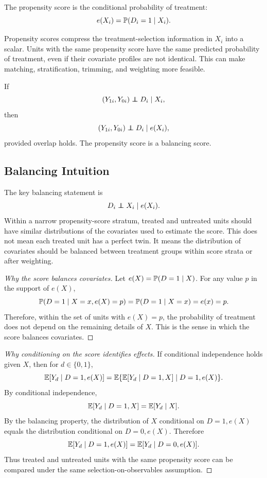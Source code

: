 \begin{defN}
The propensity score is the conditional probability of treatment:
\[
    e(X_i)=\mathbb{P}(D_i=1\mid X_i).
\]
\end{defN}

Propensity scores compress the treatment-selection information in \(X_i\) into
a scalar. Units with the same propensity score have the same predicted
probability of treatment, even if their covariate profiles are not identical.
This can make matching, stratification, trimming, and weighting more feasible.

\begin{thmN}
If
\[
    (Y_{1i},Y_{0i})\independent D_i\mid X_i,
\]
then
\[
    (Y_{1i},Y_{0i})\independent D_i\mid e(X_i),
\]
provided overlap holds. The propensity score is a balancing score.
\end{thmN}

\subsection{Balancing Intuition}

The key balancing statement is
\[
    D_i \independent X_i \mid e(X_i).
\]
Within a narrow propensity-score stratum, treated and untreated units should
have similar distributions of the covariates used to estimate the score. This
does not mean each treated unit has a perfect twin. It means the distribution of
covariates should be balanced between treatment groups within score strata or
after weighting.

\begin{proof}[Why the score balances covariates]
Let \(e(X)=\mathbb{P}(D=1\mid X)\). For any value \(p\) in the support of \(e(X)\),
\[
    \mathbb{P}(D=1\mid X=x,e(X)=p)=\mathbb{P}(D=1\mid X=x)=e(x)=p.
\]
Therefore, within the set of units with \(e(X)=p\), the probability of
treatment does not depend on the remaining details of \(X\). This is the sense
in which the score balances covariates.
\end{proof}

\begin{proof}[Why conditioning on the score identifies effects]
If conditional independence holds given \(X\), then for \(d\in\{0,1\}\),
\[
    \mathbb{E}[Y_d\mid D=1,e(X)]
    =
    \mathbb{E}\{\mathbb{E}[Y_d\mid D=1,X]\mid D=1,e(X)\}.
\]
By conditional independence,
\[
    \mathbb{E}[Y_d\mid D=1,X]=\mathbb{E}[Y_d\mid X].
\]
By the balancing property, the distribution of \(X\) conditional on
\(D=1,e(X)\) equals the distribution conditional on \(D=0,e(X)\). Therefore
\[
    \mathbb{E}[Y_d\mid D=1,e(X)] = \mathbb{E}[Y_d\mid D=0,e(X)].
\]
Thus treated and untreated units with the same propensity score can be compared
under the same selection-on-observables assumption.
\end{proof}

